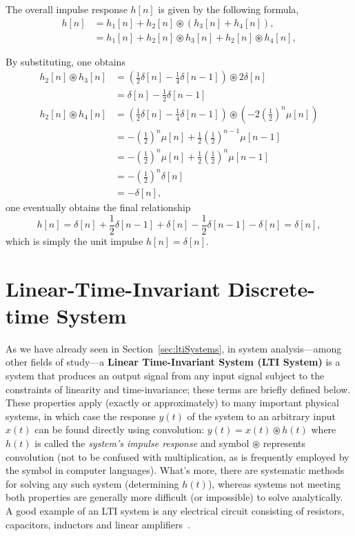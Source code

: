 \documentclass[\documentfontsize, twocolumn]{\classname}
\begin{document}
The overall impulse response $h[n]$ is given by the following formula,
\begin{align*}
    h[n] &= h_1[n] +h_2[n] \circledast (h_3[n] + h_4[n]),\\
         &= h_1[n] +h_2[n] \circledast h_3[n] + h_2[n] \circledast h_4[n],
\end{align*}

By substituting, one obtains
\begin{align*}
    h_2[n] \circledast h_3[n] &= \left(\frac 1 2 \delta[n] - \frac 1 4 \delta[n-1]\right) \circledast 2 \delta[n]\\
                              &= \delta[n] - \frac 1 2 \delta[n-1]\\
    h_2[n] \circledast h_4[n] &= \left(\frac 1 2 \delta[n] - \frac 1 4 \delta[n-1]\right) \circledast \left(-2 \left(\frac 1 2\right)^n \mu[n]\right)\\
                              &= -\left(\frac 1 2 \right)^n\mu[n] + \frac 1 2 \left(\frac 1 2\right)^{n-1} \mu[n-1]\\
                              &= -\left(\frac 1 2 \right)^n\mu[n] + \frac 1 2 \left(\frac 1 2\right)^n \mu[n-1]\\
                              &= -\left(\frac 1 2 \right)^n\delta[n] \\
                              &= -\delta[n],
\end{align*}
one eventually obtains the final relationship
\[
    h[n] = \delta[n] + \frac 1 2 \delta[n-1] + \delta[n] - \frac 1 2 \delta[n-1] - \delta[n] = \delta[n],
\]
which is simply the unit impulse $h[n] = \delta[n]$.


\chapter{Linear-Time-Invariant Discrete-time System}

As we have already seen in Section~\ref{sec:ltiSystems}, in system analysis---among other fields of study---a \textbf{Linear Time-Invariant System (LTI System)} is a system that produces an output signal from any input signal subject to the constraints of linearity and time-invariance; these terms are briefly defined below. These properties apply (exactly or ap\-pro\-xi\-ma\-te\-ly) to many important physical systems, in which case the response $y(t)$ of the system to an arbitrary input $x(t)$ can be found directly using convolution: $y(t) = x(t) \circledast h(t)$ where $h(t)$ is called the \emph{system's impulse response} and symbol \textquotesingle$\circledast$\textquotesingle{} represents convolution (not to be confused with multiplication, as is frequently employed by the symbol in computer languages). Wh\-at's more, there are systematic methods for solving any such system (determining $h(t)$), whereas systems not meeting both properties are generally more difficult (or impossible) to solve analytically. A good example of an LTI system is any electrical circuit consisting of resistors, capacitors, inductors and linear amplifiers~\cite{bib:ltiSystems}.
\end{document}
